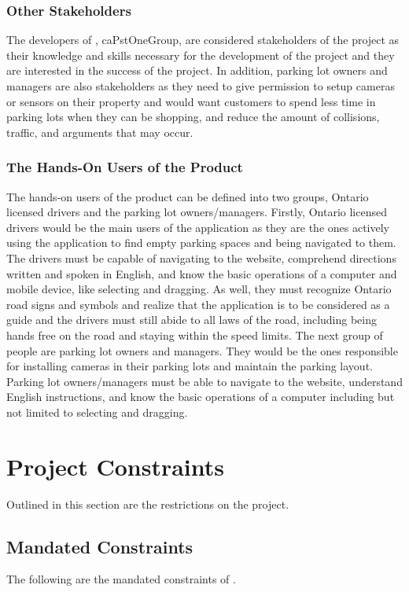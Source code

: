 \documentclass[12pt,letterpaper]{article}
\begin{document}
\subsubsection{Other Stakeholders}
The developers of \progname, caPstOneGroup, are considered stakeholders of the
project as their knowledge and skills necessary for the development of the
project and they are interested in the success of the project. In addition,
parking lot owners and managers are also stakeholders as they need to give
permission to setup cameras or sensors on their property and would want
customers to spend less time in parking lots when they can be shopping, and
reduce the amount of collisions, traffic, and arguments that may occur.


\subsubsection{The Hands-On Users of the Product}
The hands-on users of the product can be defined into two groups, Ontario
licensed drivers and the parking lot owners/managers. Firstly, Ontario licensed
drivers would be the main users of the application as they are the ones actively
using the application to find empty parking spaces and being navigated to them.
The drivers must be capable of navigating to the website, comprehend directions
written and spoken in English, and know the basic operations of a computer and
mobile device, like selecting and dragging. As well, they must recognize Ontario
road signs and symbols and realize that the application is to be considered as a
guide and the drivers must still abide to all laws of the road, including being
hands free on the road and staying within the speed limits. The next group of
people are parking lot owners and managers. They would be the ones responsible
for installing cameras in their parking lots and maintain the parking layout.
Parking lot owners/managers must be able to navigate to the website, understand
English instructions, and know the basic operations of a computer including but
not limited to selecting and dragging.

\newpage
\section{Project Constraints}
Outlined in this section are the restrictions on the project.
\subsection{Mandated Constraints}
The following are the mandated constraints of \progname.
\end{document}
